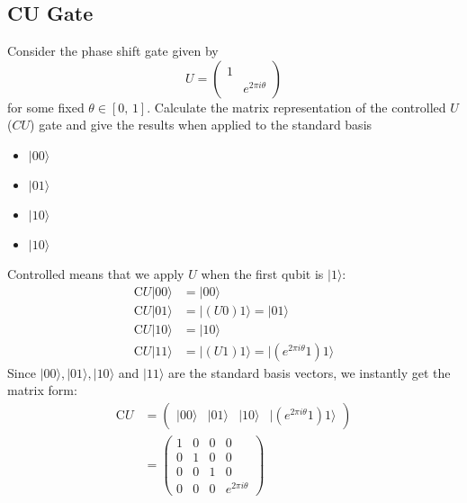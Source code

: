 \documentclass{article}
\begin{document}
  \subsection{CU Gate}
  \begin{centerframebox}
    Consider the phase shift gate given by
    \[ U = \begin{pmatrix}
      1 & \\
      & e^{2\pi i\theta}
    \end{pmatrix} \]
    for some fixed $\theta \in [0,\, 1]$.
    Calculate the matrix representation of the controlled $U$ ($CU$) gate and
    give the results when applied to the standard basis

    \begin{itemize}
      \item $|00\rangle$
      \item $|01\rangle$
      \item $|10\rangle$
      \item $|10\rangle$
    \end{itemize}
  \end{centerframebox}

  Controlled means that we apply $U$ when the first qubit is $|1\rangle$:
  \begin{align*}
      \text{C}U|00\rangle &= |00\rangle\\
      \text{C}U|01\rangle &= |(U0)1\rangle = |01\rangle\\
      \text{C}U|10\rangle &= |10\rangle\\
      \text{C}U|11\rangle &= |(U1)1\rangle = |(e^{2\pi i \theta}1)1\rangle
  \end{align*}
  Since $|00\rangle, |01\rangle, |10\rangle$ and $|11\rangle$ are the standard basis vectors, we instantly get the matrix form:
  \begin{align*}
      \text{C}U &= \begin{pmatrix}
          |00\rangle & |01\rangle & |10\rangle & |(e^{2\pi i \theta}1)1\rangle
      \end{pmatrix}\\
      &= \begin{pmatrix}
          1&0&0&0\\0&1&0&0\\0&0&1&0\\0&0&0&e^{2\pi i\theta}
      \end{pmatrix}
  \end{align*}
\end{document}

